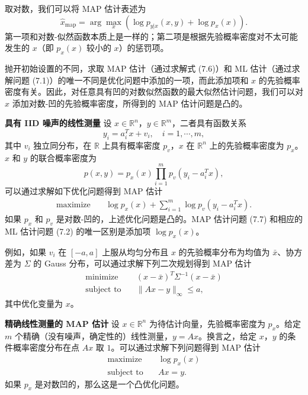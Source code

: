 \documentclass[UTF8,12pt,a4paper,fontset=fandol]{ctexart}
\begin{document}
取对数，我们可以将 MAP 估计表述为
\begin{equation}
\hat{x}_{\mathrm{map}}=\arg\max_x\left(\log p_{y|x}(x,y)+\log p_x(x)\right).
\tag{7.6}
\end{equation}
第一项和对数-似然函数本质上是一样的；第二项是根据先验概率密度对不太可能发生的 $x$（即 $p_x(x)$ 较小的 $x$）的惩罚项。

抛开初始设置的不同，求取 MAP 估计（通过求解式 (7.6)）和 ML 估计（通过求解问题 (7.1)）的唯一不同是优化问题中添加的一项，而此添加项和 $x$ 的先验概率密度有关。因此，对任意具有凹的对数似然函数的最大似然估计问题，我们可以对 $x$ 添加对数-凹的先验概率密度，所得到的 MAP 估计问题是凸的。

\noindent\textbf{具有 IID 噪声的线性测量}\quad
设 $x\in\mathbb{R}^n$，$y\in\mathbb{R}^m$，二者具有函数关系
\[
y_i=a_i^T x+v_i,\quad i=1,\cdots,m,
\]
其中 $v_i$ 独立同分布，在 $\mathbb{R}$ 上具有概率密度 $p_v$，$x$ 在 $\mathbb{R}^n$ 上的先验概率密度为 $p_x$。$x$ 和 $y$ 的联合概率密度为
\[
p(x,y)=p_x(x)\prod_{i=1}^m p_v(y_i-a_i^T x),
\]
可以通过求解如下优化问题得到 MAP 估计
\begin{equation}
\begin{aligned}
\text{maximize}\quad & \log p_x(x)+\sum_{i=1}^m \log p_v(y_i-a_i^T x).
\end{aligned}
\tag{7.7}
\end{equation}
如果 $p_x$ 和 $p_v$ 是对数-凹的，上述优化问题是凸的。MAP 估计问题 (7.7) 和相应的 ML 估计问题 (7.2) 的唯一区别是添加项 $\log p_x(x)$。

例如，如果 $v_i$ 在 $[-a,a]$ 上服从均匀分布且 $x$ 的先验概率分布为均值为 $\bar{x}$、协方差为 $\Sigma$ 的 Gauss 分布，可以通过求解下列二次规划得到 MAP 估计
\[
\begin{aligned}
\text{minimize}\quad & (x-\bar{x})^T\Sigma^{-1}(x-\bar{x})\\
\text{subject to}\quad & \|Ax-y\|_\infty\leq a,
\end{aligned}
\]
其中优化变量为 $x$。

\noindent\textbf{精确线性测量的 MAP 估计}\quad
设 $x\in\mathbb{R}^n$ 为待估计向量，先验概率密度为 $p_x$。给定 $m$ 个精确（没有噪声，确定性的）线性测量，$y=Ax$。换言之，给定 $x$，$y$ 的条件概率密度分布在点 $Ax$ 取 $1$。可以通过求解下列问题得到 MAP 估计
\[
\begin{aligned}
\text{maximize}\quad & \log p_x(x)\\
\text{subject to}\quad & Ax=y.
\end{aligned}
\]
如果 $p_x$ 是对数凹的，那么这是一个凸优化问题。
\end{document}
